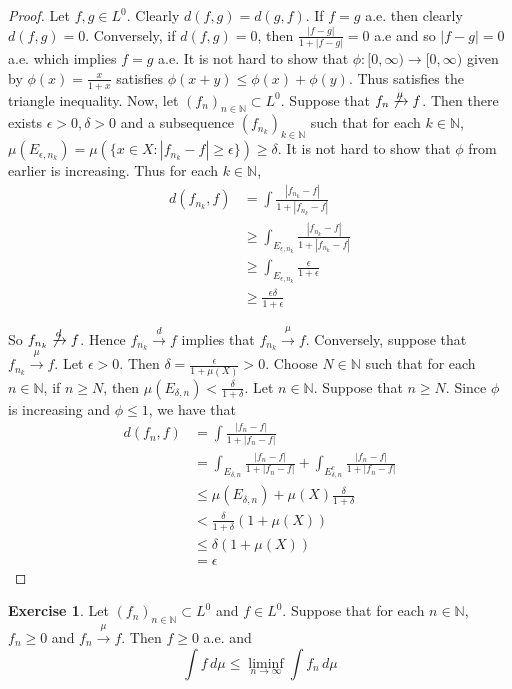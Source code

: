 \documentclass{book}
\theoremstyle{definition}
\newtheorem{ex}[definition]{Exercise}
\newcommand{\del}{\delta}
\newcommand{\ep}{\epsilon}
\newcommand{\N}{\mathbb{N}}
\newcommand{\lex}[1]{\label{ex:#1}}
\DeclareMathOperator*{\0}{\mbf{0}}
\DeclareMathOperator*{\1}{\mbf{1}}
\newcommand{\limfn}{\liminf \limits_{n \rightarrow \infty}}
\newcommand{\conv}[1]{\xrightarrow{#1}}
\newcommand{\Rg}{[0,\infty)}
\newcommand{\dmu}{\, d \mu}
\begin{document}
	\begin{proof}
		Let $f,g \in L^0$. Clearly $d(f,g) = d(g,f)$. If $f = g$ a.e. then clearly $d(f,g) = 0$. Conversely, if $d(f,g) = 0$, then $\frac{|f-g|}{1 + |f-g|} = 0$ a.e and so $|f-g| = 0$ a.e. which implies $f =g$ a.e. It is not hard to show that $\phi: \Rg \rightarrow \Rg$ given by $\phi(x) = \frac{x}{1+x}$ satisfies $\phi(x+y) \leq \phi(x)+\phi(y)$. Thus satisfies the triangle inequality. Now, let $(f_n)_{n \in \N} \subset L^0$. Suppose that $f_n \not \conv{\mu} f$. Then there exists $\ep>0, \del>0$ and a subsequence $(f_{n_k})_{k \in \N}$ such that for each $k \in \N$, $\mu(E_{\ep,n_k}) = \mu(\{x \in X: |f_{n_k} - f| \geq \ep\}) \geq \del $. It is not hard to show that $\phi$ from earlier is increasing. Thus for each $k \in \N$, 
		\begin{align*}
			d(f_{n_k},f)
			&= \int \frac{|f_{n_k} -f|}{1+|f_{n_k} -f|}\\
			& \geq \int_{E_{\ep,n_k}} \frac{|f_{n_k} -f|}{1+|f_{n_k} -f|}\\
			& \geq \int_{E_{\ep, n_k}} \frac{\ep}{1+\ep}\\
			& \geq \frac{\ep\del}{1+\ep}
		\end{align*}
		
		So $f_{n_k} \not \conv{d} f$. Hence $f_{n_k} \conv{d} f$ implies that $f_{n_k} \conv{\mu} f$. Conversely, suppose that $f_{n_k} \conv{\mu} f$. Let $\ep >0.$ Then $\del = \frac{\ep}{1+\mu(X)} > 0$. Choose $N \in \N$ such that for each $n \in \N$, if $n \geq N$, then $\mu(E_{\del, n}) < \frac{\del}{1+\del}$. Let $n \in \N$. Suppose that $n \geq N$. Since $\phi$ is increasing and $\phi \leq 1$, we have that 
		\begin{align*}
			d(f_n,f)
			&= \int \frac{|f_n -f|}{1+|f_n -f|}\\
			&= \int_{E_{\del,n}} \frac{|f_n -f|}{1+|f_n -f|} + \int_{E_{\del,n}^c} \frac{|f_n -f|}{1+|f_n -f|}\\
			&\leq \mu(E_{\del,n}) + \mu(X)\frac{\del}{1+\del}\\
			& < \frac{\del}{1+\del}(1+\mu(X))\\
			& \leq \del(1+\mu(X))\\
			& = \ep
		\end{align*}
	\end{proof}
	
	\begin{ex} \lex{35008} 
		Let $(f_n)_{n \in \N} \subset L^0$ and $f \in L^0$. Suppose that for each $n \in \N$, $f_n \geq 0$ and $f_n \conv{\mu} f$. Then $f \geq 0$ a.e. and $$\int f \dmu \leq \limfn \int f_n \dmu $$
	\end{ex}
	
\end{document}
